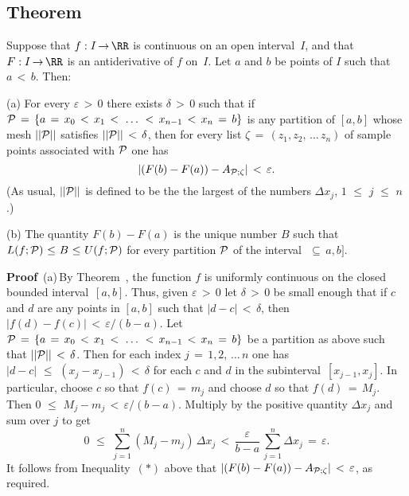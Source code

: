 \VV

             \subsection{\small{\bf Theorem}}
             \label{TheoremE45.130}

\V

        Suppose that $f:I \,{\rightarrow}\, {\RR}$ is continuous on an open interval~$I$,
    and that $F:I \,{\rightarrow}\, {\RR}$ is an antiderivative of $f$ on~$I$. Let $a$ and $b$ be points of $I$ such that $a\,<\,b$. Then:

\V

        (a) For every ${\varepsilon}\,>\,0$ there exists ${\delta}\,>\,0$ such that if
    ${\cal P} \,=\, \{a \,=\, x_{0}\,<\,x_{1}\,<\,\,{\ldots}\,\,<\,x_{n-1}\,<\,x_{n} \,=\, b\}$ is any partition of $[a,b]$ whose mesh $||{\cal P}||$
    satisfies $||{\cal P}||\,<\,{\delta}$, then for every list ${\zeta} \,=\, (z_{1}, z_{2},\,{\ldots}\,z_{n})$ of sample points associated with ${\cal P}$
    one has
        \begin{displaymath}
        \left|(F(b)-F(a)) - A_{{\cal P};{\zeta}}\right|\,<\,{\varepsilon}.
        \end{displaymath}
    (As usual, $||{\cal P}||$ is defined to be the the largest of the numbers ${\Delta}x_{j}$, $1\,\,{\leq}\,\,j\,\,{\leq}\,\,n$.)

\V

        (b) The quantity $F(b) - F(a)$ is the unique number $B$ such that $L(f;{\cal P})\,\,{\leq}\,\,B\,\,{\leq}\,\,U(f;{\cal P})$
    for every partition ${\cal P}$ of the interval~$ \,{\subseteq}\, a,b]$.

\V

        {\bf Proof}\, (a)\,By Theorem~, the function $f$ is uniformly continuous on the closed bounded interval~$[a,b]$.
    Thus, given ${\varepsilon}\,>\,0$ let ${\delta}\,>\,0$ be small enough that if $c$ and $d$
    are any points in $[a,b]$ such that $|d-c|\,<\,{\delta}$, then $|f(d)-f(c)|\,<\,{\varepsilon}/(b-a)$.
    Let ${\cal P} \,=\, \{a \,=\, x_{0}\,<\,x_{1}\,<\,\,{\ldots}\,\,<\,x_{n-1}\,<\,x_{n} \,=\, b\}$ be a partition as above such that $||{\cal P}||\,<\,{\delta}$.
    Then for each index $j \,=\, 1,2,\,{\ldots}\,n$ one has $|d-c|\,\,{\leq}\,\,(x_{j}-x_{j-1})\,<\,{\delta}$ for each $c$ and $d$ in the subinterval~$[x_{j-1},x_{j}]$.
    In particular, choose $c$ so that $f(c) \,=\, m_{j}$ and choose $d$ so that $f(d) \,=\, M_{j}$. Then $0\,\,{\leq}\,\,M_{j} - m_{j}\,<\,{\varepsilon}/(b-a)$.
    Multiply by the positive quantity ${\Delta}x_{j}$ and sum over $j$ to get
        \begin{displaymath}
        0\,\,{\leq}\,\,\sum_{j=1}^{n} (M_{j}-m_{j})\,{\Delta}x_{j}\,<\,\frac{{\varepsilon}}{b-a}\,\sum_{j=1}^{n} {\Delta}x_{j} \,=\, {\varepsilon}. 
        \end{displaymath}
    It follows from Inequality~$({\ast})$ above that $|(F(b)-F(a)) - A_{{\cal P}; {\zeta}}|\,<\,{\varepsilon}$, as required.

